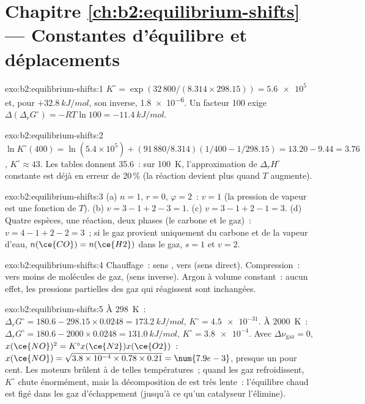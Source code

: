 \section*{Chapitre \ref{ch:b2:equilibrium-shifts} --- Constantes d'équilibre et déplacements}

\begin{solution}{exo:b2:equilibrium-shifts:1}
$K^\circ = \exp(32\,800/(8.314 \times 298.15)) = \num{5.6e5}$ et, pour
$+\qty{32.8}{kJ/mol}$, son inverse, \num{1.8e-6}. Un facteur 100 exige
$\Delta(\Delta_r G^\circ) = -RT\ln 100 = \qty{-11.4}{kJ/mol}$.
\end{solution}

\begin{solution}{exo:b2:equilibrium-shifts:2}
$\ln K^\circ(400) = \ln(5.4 \times 10^5) + (91\,880/8.314)(1/400 -
1/298.15) = 13.20 - 9.44 = 3.76$, $K^\circ \approx 43$. Les tables donnent 35.6~:
sur \qty{100}{K}, l'approximation de $\Delta_r H^\circ$ constante est déjà
en erreur de 20\,\% (la réaction devient plus  quand $T$ augmente).
\end{solution}

\begin{solution}{exo:b2:equilibrium-shifts:3}
(a) $n = 1$, $r = 0$, $\varphi = 2$~: $v = 1$ (la pression de vapeur est une fonction
de $T$). (b) $v = 3 - 1 + 2 - 3 = 1$. (c) $v = 3 - 1 + 2 - 1 = 3$. (d) Quatre
espèces, une réaction, deux phases (le carbone et le gaz)~: $v = 4 - 1 + 2 - 2 =
3$~; si le gaz provient uniquement du carbone et de la vapeur d'eau, $n(\ce{CO}) = n(\ce{H2})$
dans le gaz, $s = 1$ et $v = 2$.
\end{solution}

\begin{solution}{exo:b2:equilibrium-shifts:4}
Chauffage~: sens , vers  (sens direct). Compression~:
vers moins de molécules de gaz,  (sens inverse). Argon à volume constant~:
aucun effet, les pressions partielles des gaz qui réagissent sont inchangées.
\end{solution}

\begin{solution}{exo:b2:equilibrium-shifts:5}
À \qty{298}{K}~: $\Delta_r G^\circ = 180.6 - 298.15 \times 0.0248 =
\qty{173.2}{kJ/mol}$, $K^\circ = \num{4.5e-31}$. À \qty{2000}{K}~: $\Delta_r
G^\circ = 180.6 - 2000 \times 0.0248 = \qty{131.0}{kJ/mol}$, $K^\circ =
\num{3.8e-4}$. Avec $\Delta\nu_{\text{gaz}} = 0$, $x(\ce{NO})^2 = K^\circ x(\ce{N2})
x(\ce{O2})$~: $x(\ce{NO}) = \sqrt{3.8 \times 10^{-4} \times 0.78 \times 0.21} =
\num{7.9e-3}$, presque un pour cent. Les moteurs brûlent à de telles températures~; quand les
gaz refroidissent, $K^\circ$ chute énormément, mais la décomposition de  est
très lente~: l'équilibre chaud est figé dans les gaz d'échappement (jusqu'à ce qu'un catalyseur
l'élimine).
\end{solution}

